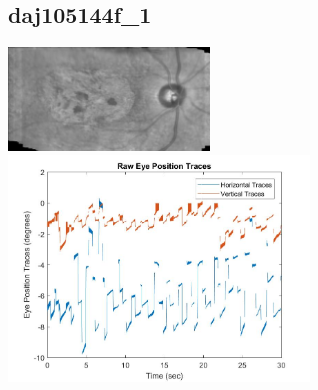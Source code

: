 \documentclass[11pt]{article}
\begin{document}
\subsection{daj105144f\_1}
\includegraphics[width=0.40\textwidth, valign=m]{referenceframes/rodenstock_amd/daj105144f_1_dwt_nostim_gamscaled_bandfilt_refframe.jpg}
\includegraphics[width=0.60\textwidth, valign=m]{eyepositiontraces/rodenstock_amd/daj105144f_1.jpg}\\
\end{document}

